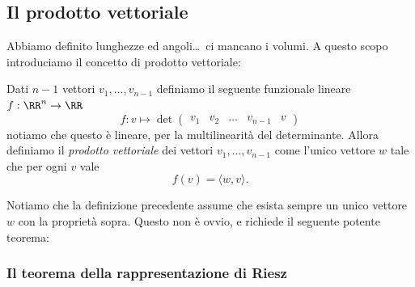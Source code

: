 \documentclass[11pt]{scrartcl}
\begin{document}
   	 \newpage
   	 
   	 \subsection{Il prodotto vettoriale}
   	 Abbiamo definito lunghezze ed angoli\dots\, ci mancano i volumi. A questo scopo introduciamo il concetto di prodotto vettoriale:
   	 \begin{definition}
   	 	Dati $n-1$ vettori $v_1,\dots,v_{n-1}$ definiamo il seguente funzionale lineare $f:\RR^n\to \RR$
   	 	$$f:v\mapsto \det\left(
   	 	\begin{array}{c|c|c|c|c}
   	 		v_1 & v_2 & \dots & v_{n-1} & v
   	 	\end{array}
   	 	\right)$$
   	 	notiamo che questo è lineare, per la multilinearità del determinante. Allora definiamo il \textit{prodotto vettoriale} dei vettori $v_1,\dots,v_{n-1}$ come l'unico vettore $w$ tale che per ogni $v$ vale
   	 	$$f(v)=\langle w,v\rangle.$$
   	 \end{definition}
   	 Notiamo che la definizione precedente assume che esista sempre un unico vettore $w$ con la proprietà sopra. Questo non è ovvio, e richiede il seguente potente teorema:
   	 
   	 \subsubsection{Il teorema della rappresentazione di Riesz}
   	 
\end{document}
